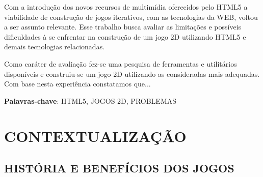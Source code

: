 \documentclass{article}
\begin{document}
 
Com a introdução dos novos recursos de multimídia oferecidos pelo HTML5 a viabilidade de construção de jogos iterativos, com as tecnologias da WEB, voltou a ser assunto relevante. Esse trabalho busca avaliar as limitações e possíveis dificuldades à se enfrentar na construção de um jogo 2D utilizando HTML5 e demais tecnologias relacionadas.

Como caráter de avaliação fez-se uma pesquisa de ferramentas e utilitários disponíveis e construiu-se um jogo 2D utilizando as consideradas mais adequadas. Com base nesta experiência constatamos que...


\textbf{Palavras-chave}: HTML5, JOGOS 2D, PROBLEMAS

\newpage

\listoffigures
\listoftables
\newpage

\tableofcontents
\newpage

\section{CONTEXTUALIZAÇÃO}
\subsection{HISTÓRIA E BENEFÍCIOS DOS JOGOS}
\end{document}
